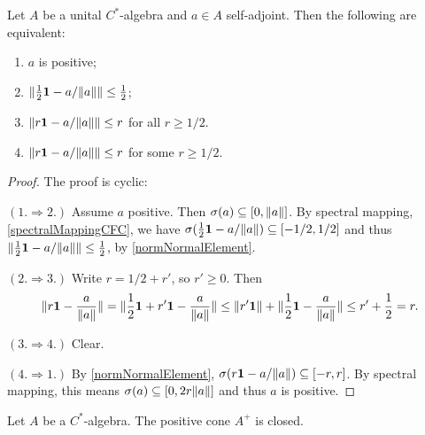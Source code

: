 \begin{lemma} \label{positivityDistanceToNorm}
Let $A$ be a unital $C^*$-algebra and $a\in A$ self-adjoint. Then the following are equivalent:
\begin{enumerate}
\item $a$ is positive;
\item $\lVert\frac{1}{2}\boldsymbol{\mathrm{1}} - a / \lVert a\rVert\rVert \leq \frac{1}{2}$;
\item $\lVert r\boldsymbol{\mathrm{1}} - a / \lVert a\rVert\rVert \leq r$ for all $r\geq 1/2$.
\item $\lVert r\boldsymbol{\mathrm{1}} - a / \lVert a\rVert\rVert \leq r$ for some $r\geq 1/2$.
\end{enumerate}
\end{lemma}
\begin{proof}
The proof is cyclic:

$(1.\Rightarrow 2.)$ Assume $a$ positive. Then $\sigma(a) \subseteq [0,\lVert a\rVert]$. By spectral mapping, \ref{spectralMappingCFC}, we have $\sigma(\frac{1}{2}\boldsymbol{\mathrm{1}} - a / \lVert a\rVert) \subseteq [-1/2, 1/2]$ and thus $\lVert\frac{1}{2}\boldsymbol{\mathrm{1}} - a / \lVert a\rVert\rVert \leq \frac{1}{2}$, by \ref{normNormalElement}.

$(2.\Rightarrow 3.)$ Write $r = 1/2 + r'$, so $r'\geq 0$. Then
\[ \lVert r\boldsymbol{\mathrm{1}} - \frac{a}{\lVert a\rVert}\rVert = \lVert\frac{1}{2}\boldsymbol{\mathrm{1}} + r'\boldsymbol{\mathrm{1}} - \frac{a}{\lVert a\rVert}\rVert \leq \lVert r'\boldsymbol{\mathrm{1}}\rVert+ \lVert\frac{1}{2}\boldsymbol{\mathrm{1}} - \frac{a}{\lVert a\rVert}\rVert \leq r' + \frac{1}{2} = r. \]

$(3.\Rightarrow 4.)$ Clear.

$(4.\Rightarrow 1.)$ By \ref{normNormalElement}, $\sigma(r\boldsymbol{\mathrm{1}} - a / \lVert a\rVert) \subseteq [-r, r]$. By spectral mapping, this means $\sigma(a) \subseteq [0, 2r\lVert a\rVert]$ and thus $a$ is positive.
\end{proof}
\begin{corollary} \label{CstarPositiveConeClosed}
Let $A$ be a $C^*$-algebra. The positive cone $A^+$ is closed.
\end{corollary}
